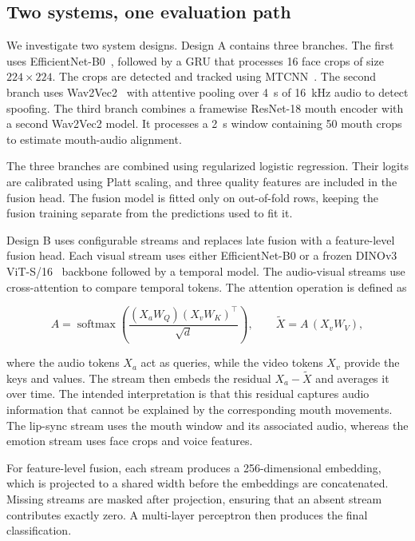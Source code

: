 \documentclass[conference]{IEEEtran}
\begin{document}
\subsection{Two systems, one evaluation path}

We investigate two system designs. Design A contains three branches. The
first uses EfficientNet-B0~\cite{efficientnet}, followed by a GRU that
processes 16 face crops of size $224\times224$. The crops are detected and
tracked using MTCNN~\cite{mtcnn}. The second branch uses Wav2Vec2~\cite{wav2vec2}
with attentive pooling over 4~s of 16~kHz audio to detect spoofing. The third
branch combines a framewise ResNet-18 mouth encoder with a second Wav2Vec2
model. It processes a 2~s window containing 50 mouth crops to estimate
mouth-audio alignment.

The three branches are combined using regularized logistic regression. Their
logits are calibrated using Platt scaling, and three quality features are
included in the fusion head. The fusion model is fitted only on out-of-fold
rows, keeping the fusion training separate from the predictions used to fit
it.

Design B uses configurable streams and replaces late fusion with a
feature-level fusion head. Each visual stream uses either EfficientNet-B0 or
a frozen DINOv3 ViT-S/16~\cite{dinov3} backbone followed by a temporal model.
The audio-visual streams use cross-attention to compare temporal tokens. The
attention operation is defined as

\begin{equation}
A = \operatorname{softmax}\!\left(\frac{(X_a W_Q)(X_v W_K)^\top}{\sqrt{d}}\right),
\qquad \tilde{X} = A\,(X_v W_V),
\end{equation}

where the audio tokens $X_a$ act as queries, while the video tokens $X_v$
provide the keys and values. The stream then embeds the residual
$X_a-\tilde{X}$ and averages it over time. The intended interpretation is
that this residual captures audio information that cannot be explained by the
corresponding mouth movements. The lip-sync stream uses the mouth window and
its associated audio, whereas the emotion stream uses face crops and voice
features.

For feature-level fusion, each stream produces a 256-dimensional embedding,
which is projected to a shared width before the embeddings are concatenated.
Missing streams are masked after projection, ensuring that an absent stream
contributes exactly zero. A multi-layer perceptron then produces the final
classification.
\end{document}
